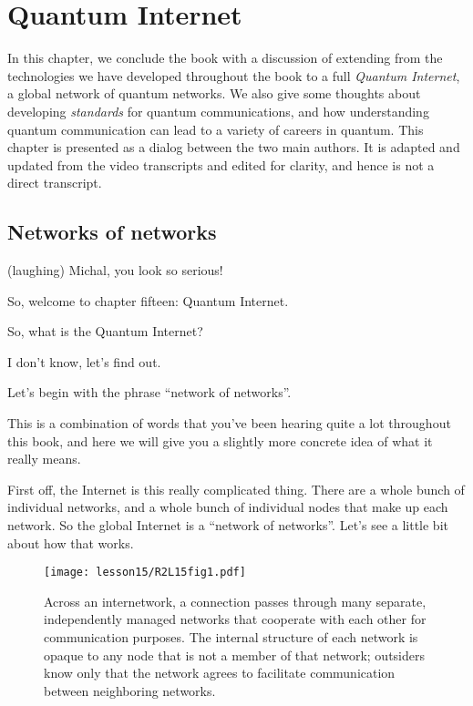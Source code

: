 \chapter{Quantum Internet}

In this chapter, we conclude the book with a discussion of extending from the technologies we have developed throughout the book to a full \emph{Quantum Internet}, a global network of quantum networks. We also give some thoughts about developing \emph{standards} for quantum communications, and how understanding quantum communication can lead to a variety of careers in quantum. This chapter is presented as a dialog between the two main authors. It is adapted and updated from the video transcripts and edited for clarity, and hence is not a direct transcript.

\section{Networks of networks}

\rrr (laughing) Michal, you look so serious!

So, welcome to chapter fifteen: Quantum Internet.


\mmm So, what is the Quantum Internet?

\rrr I don't know, let's find out. 

\mmm %

Let's begin with the phrase ``network of networks''.

This is a combination of words that you've been hearing quite a lot throughout this book, and here we will give you a slightly more concrete idea of what it really means.

\rrr First off, the Internet is this really complicated thing. There are a whole bunch of individual networks, and a whole bunch of individual nodes that make up each network. So the global Internet is a ``network of networks''. Let's see a little bit about how that works.

\begin{figure}[t]
    \centering
    \texttt{[image: lesson15/R2L15fig1.pdf]}
    \caption[Network of Networks]{Across an internetwork, a connection passes through many separate, independently managed networks that cooperate with each other for communication purposes.  The internal structure of each network is opaque to any node that is not a member of that network; outsiders know only that the network agrees to facilitate communication between neighboring networks.}
    \label{fig:15-1-NofN}
\end{figure}


